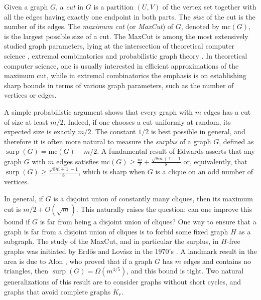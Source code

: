 \documentclass[11pt]{article}
\theoremstyle{plain}
\theoremstyle{definition}
\DeclareMathOperator{\surp}{surp}
\begin{document}
Given a graph $G$, a \emph{cut} in $G$ is a partition $(U,V)$ of the vertex set together with all the edges having exactly one endpoint in both parts. The \emph{size} of the cut is the number of its edges. The \emph{maximum cut} (or \emph{MaxCut}) of $G$, denoted by $\mbox{mc}(G)$, is the largest possible size of a cut. The MaxCut is among the most extensively studied graph parameters, lying at the intersection of theoretical computer science \cite{EMS,GW95,KKMO}, extremal combinatorics \cite{AlonMaxCut,ABKS,Edwards1,erdos} and probabilistic graph theory \cite{CGHS,CLMS,DMS}. In theoretical computer science, one is usually interested in efficient approximations of the maximum cut, while in extremal combinatorics the emphasis is on establishing sharp bounds in terms of various graph parameters, such as the number of vertices or edges. 

A simple probabilistic argument shows that every graph with $m$ edges has a cut of size at least $m/2$. Indeed, if one chooses a cut uniformly at random, its expected size is exactly $m/2$. The constant $1/2$ is best possible in general, and therefore it is often more natural to measure the \emph{surplus} of a graph $G$, defined as $\surp(G)=\mbox{mc}(G)-m/2$. A fundamental result of Edwards \cite{Edwards1,Edwards2} asserts that any graph $G$ with $m$ edges satisfies $\mbox{mc}(G)\geq \frac{m}{2}+\frac{\sqrt{8m+1}-1}{8}$ or, equivalently, that $\surp(G)\geq \frac{\sqrt{8m+1}-1}{8}$, which is sharp when $G$ is a clique on an odd number of vertices. 

In general, if $G$ is a disjoint union of constantly many cliques, then its maximum cut is $m/2+O(\sqrt{m})$. This naturally raises the question: can one improve this bound if $G$ is far from being a disjoint union of cliques? One way to ensure that a graph is far from a disjoint union of cliques is to forbid some fixed graph $H$ as a subgraph. The study of the MaxCut, and in particular the surplus, in $H$-free graphs was initiated by Erd\H{o}s and Lov\'asz in the 1970's \cite{erdos}. A landmark result in the area is due to Alon \cite{AlonMaxCut}, who proved that if a graph $G$ has $m$ edges and contains no triangles, then $\surp(G)=\Omega(m^{4/5})$, and this bound is tight. Two natural generalizations of this result are to consider graphs without short cycles, and graphs that avoid complete graphs $K_r$. 
\end{document}
